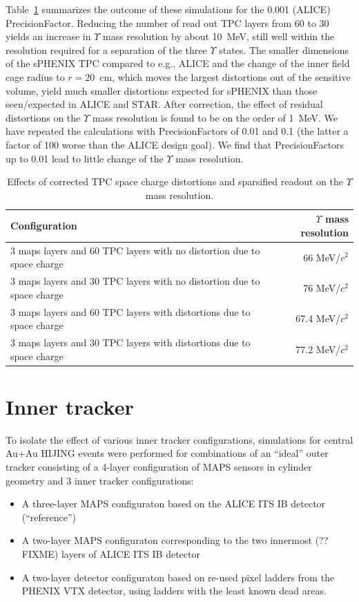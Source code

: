 Table~\ref{tab:upsilon_mass_resolution} summarizes the outcome of these simulations for the 0.001 (ALICE) PrecisionFactor. Reducing the number of 
read out TPC layers from 60 to 30 yields an increase in $\Upsilon$ mass resolution by about 10~MeV, still well within the resolution required
for a separation of the three $\Upsilon$ states. The smaller dimensions of the sPHENIX TPC compared to e.g., ALICE and the change of the inner
field cage radius to $r = 20$~cm, which moves the largest distortions out of the sensitive volume, yield much smaller distortions expected
for sPHENIX than those seen/expected in ALICE and STAR. After correction, the effect of residual distortions on the $\Upsilon$ mass resolution is 
found to be on the order of 1~MeV. We have repeated the calculations with PrecisionFactors of 0.01 and 0.1 (the latter a factor of 100 worse
than the ALICE design goal). We find that PrecisionFactors up to 0.01 lead to little change of the $\Upsilon$ mass resolution. 

\begin{table}
  \centering
  \begin{tabular}{lr}
    \toprule
    Configuration & $\Upsilon$ mass resolution \\
    \midrule
3 maps layers and 60 TPC layers with no distortion due to space charge
&  66 MeV/$c^2$ \\
3 maps layers and 30 TPC layers with no distortion due to space charge
& 76 MeV/$c^2$ \\
3 maps layers and 60 TPC layers with distortions due to space charge
& 67.4 MeV/$c^2$ \\
3 maps layers and 30 TPC layers with distortions due to space charge
& 77.2 MeV/$c^2$ \\
    \bottomrule
  \end{tabular}
  \caption{Effects of corrected TPC space charge distortions and sparsified readout on the $\Upsilon$ mass resolution.}
  \label{tab:upsilon_mass_resolution}
\end{table}



\section{Inner tracker}
\label{sec:innertracker}

To isolate the effect of various inner tracker configurations, simulations for central Au+Au HIJING events were performed for 
combinations of an ``ideal'' outer tracker consisting of a 4-layer configuration of MAPS sensors in cylinder geometry and 
3 inner tracker configurations:
\begin{itemize}
\item A three-layer MAPS configuraton based on the ALICE ITS IB detector (``reference'')
\item A two-layer MAPS configuraton corresponding to the two innermost (?? FIXME) layers of ALICE ITS IB detector
\item A two-layer detector configuraton based on re-used pixel ladders from the PHENIX VTX detector, using ladders with
the least known dead areas. 
\end{itemize}


